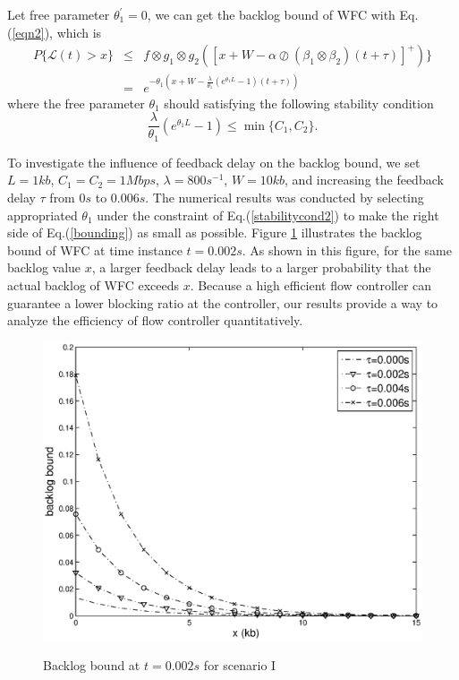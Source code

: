 \documentclass[12pt]{article}
\begin{document}
Let free parameter $\theta_1^\prime=0$, we can get the backlog bound of WFC with Eq.(\ref{eqn2}), which is
\begin{eqnarray}\label{bounding}
P\{\mathcal{L}(t)>x\}&\leq& f\otimes g_1\otimes g_2([x+W-\alpha\oslash(\beta_1\otimes\beta_2)(t+\tau)]^+)\}\nonumber\\
&=& e^{-\theta_1(x+W-\frac{\lambda}{\theta_1}(e^{\theta_1 L}-1)(t+\tau))}
\end{eqnarray}
where the free parameter $\theta_1$ should satisfying the following stability condition
\begin{equation}\label{stabilitycond2}
\frac{\lambda}{\theta_1}(e^{\theta_1 L}-1)\leq \min\{C_1,C_2\}.
\end{equation}

To investigate the influence of feedback delay on the backlog bound, we set $L=1kb$, $C_1=C_2=1Mbps$, $\lambda=800s^{-1}$, $W=10kb$, and increasing the feedback delay $\tau$ from $0s$ to $0.006s$. The numerical results was conducted by selecting appropriated $\theta_1$ under the constraint of Eq.(\ref{stabilitycond2}) to make the right side of Eq.(\ref{bounding}) as small as possible. Figure \ref{backlogtau} illustrates the backlog bound of WFC at time instance $t=0.002s$. As shown in this figure, for the same backlog value $x$, a larger feedback delay leads to a larger probability that the actual backlog of WFC exceeds $x$. Because a high efficient flow controller can guarantee a lower blocking ratio at the controller, our results  provide a way to analyze the efficiency of flow controller quantitatively.
\begin{figure}[bpt]
  \centering
  \includegraphics[scale=0.45]{figures/backlogtau.eps}\\
  \caption{Backlog bound at $t=0.002s$ for scenario I}\label{backlogtau}
\end{figure}
\end{document}
